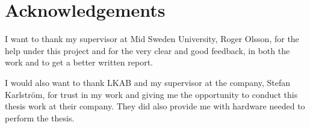 \chapter*{Acknowledgements}
I want to thank my supervisor at Mid Sweden University, Roger Olsson, for the help under this project and for the very clear and good feedback, in both the work and to get a better written report.

\bigskip

I would also want to thank LKAB and my supervisor at the company, Stefan Karlström, for trust in my work and giving me the opportunity to conduct this thesis work at their company. They did also provide me with hardware needed to perform the thesis.


